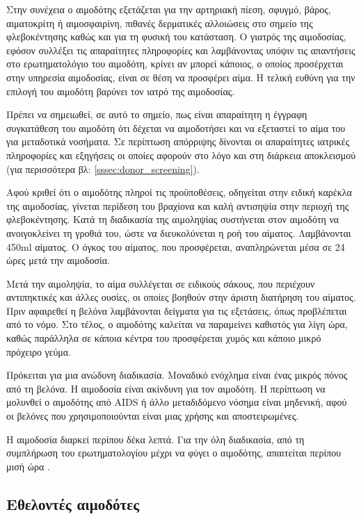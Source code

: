 		 Στην συνέχεια ο αιμοδότης εξετάζεται για την αρτηριακή πίεση, σφυγμό, βάρος, αιματοκρίτη ή αιμοσφαιρίνη, πιθανές δερματικές αλλοιώσεις στο σημείο της φλεβοκέντησης καθώς και για τη φυσική του κατάσταση. Ο γιατρός της αιμοδοσίας, εφόσον συλλέξει τις απαραίτητες πληροφορίες και λαμβάνοντας υπόψιν τις απαντήσεις στο ερωτηματολόγιο του αιμοδότη, κρίνει αν μπορεί κάποιος, ο οποίος προσέρχεται στην υπηρεσία αιμοδοσίας, είναι σε θέση να προσφέρει αίμα. Η τελική ευθύνη για την επιλογή του αιμοδότη βαρύνει τον ιατρό της αιμοδοσίας.
		 
		Πρέπει να σημειωθεί, σε αυτό το σημείο, πως είναι απαραίτητη η έγγραφη συγκατάθεση του αιμοδότη ότι δέχεται να αιμοδοτήσει και να εξεταστεί το αίμα του για μεταδοτικά νοσήματα. Σε περίπτωση απόρριψης δίνονται οι απαραίτητες ιατρικές πληροφορίες και εξηγήσεις οι οποίες αφορούν στο λόγο και στη διάρκεια αποκλεισμού (για περισσότερα βλ: \ref{sssec:donor_screening}).
		
		Αφού κριθεί ότι ο αιμοδότης πληροί τις προϋποθέσεις, οδηγείται στην ειδική καρέκλα της αιμοδοσίας, γίνεται περίδεση του βραχίονα και καλή αντισηψία στην περιοχή της φλεβοκέντησης. Κατά τη διαδικασία της αιμοληψίας συστήνεται στον αιμοδότη να ανοιγοκλείνει τη γροθιά του, ώστε να διευκολύνεται η ροή του αίματος. Λαμβάνονται 450ml αίματος. Ο όγκος του αίματος, που προσφέρεται, αναπληρώνεται μέσα σε 24 ώρες μετά την αιμοδοσία.
		
		Μετά την αιμοληψία, το αίμα συλλέγεται σε ειδικούς σάκους, που περιέχουν αντιπηκτικές και άλλες ουσίες, οι οποίες βοηθούν στην άριστη διατήρηση του αίματος. Πριν αφαιρεθεί η βελόνα λαμβάνονται δείγματα για τις εξετάσεις, όπως προβλέπεται από το νόμο. Στο τέλος, ο αιμοδότης καλείται να παραμείνει καθιστός για λίγη ώρα, καθώς παράλληλα σε κάποια κέντρα του προσφέρεται χυμός και κάποιο μικρό πρόχειρο γεύμα.
		
		Πρόκειται για μια ανώδυνη διαδικασία. Μοναδικό ενόχλημα είναι ένας μικρός πόνος από τη βελόνα. Η αιμοδοσία είναι ακίνδυνη για τον αιμοδότη. Η περίπτωση να μολυνθεί ο αιμοδότης από AIDS ή άλλο μεταδιδόμενο νόσημα είναι μηδενική, αφού οι βελόνες που χρησιμοποιούνται είναι μιας χρήσης και αποστειρωμένες.
		
		Η αιμοδοσία διαρκεί περίπου δέκα λεπτά. Για την όλη διαδικασία, από τη συμπλήρωση του ερωτηματολογίου μέχρι να φύγει ο αιμοδότης, απαιτείται περίπου μισή ώρα \cite{diadikasiaAimodosias}.
	\subsection{Εθελοντές αιμοδότες}
